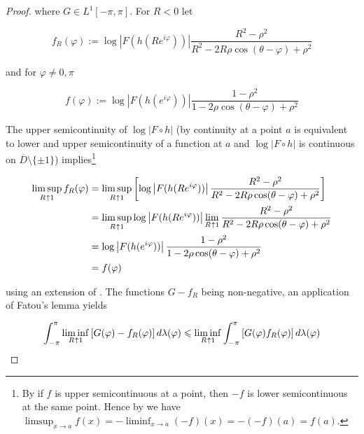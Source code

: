 \begin{proof}
where $G \in L^1[-\pi,\pi]$. For $R < 0$ let

\begin{equation*}
	f_R(\varphi) := \log\left| F(h(Re^{i\varphi}))\right| \frac{R^2 - \rho^2}{R^2 - 2R\rho\cos(\theta - \varphi) + \rho^2}
\end{equation*}

and for $\varphi \neq 0,\pi$

\begin{equation*}
	f(\varphi) := \log\left| F(h(e^{i\varphi}))\right| \frac{1 - \rho^2}{1 - 2\rho\cos(\theta - \varphi) + \rho^2}
\end{equation*}

The upper semicontinuity of $\log\left| F \circ h\right|$ (by \cite[360]{bourbaki:general_topology:1995} continuity at a point $a$ is equivalent to lower and upper semicontinuity of a function at $a$ and $\log \left| F \circ h\right|$ is continuous on $\overline{D}\setminus \{\pm 1\}$) implies\footnote{
	By \cite[360]{bourbaki:general_topology:1995} if $f$ is upper semicontinuous at a point, then $-f$ is lower semicontinuous at the same point. Hence by \cite[363]{bourbaki:general_topology:1995} we have $\limsup_{x \to a} f(x) = -\liminf_{x \to a}\left( -f \right)(x) = -\left( -f \right)(a) = f(a)$.
}

\begin{equation*}
	\begin{aligned}
		\limsup_{R \toup 1}f_R(\varphi) &= \limsup_{R \toup 1} \left[ \log\left| F(h(Re^{i\varphi}))\right| \frac{R^2 - \rho^2}{R^2 - 2R\rho\cos(\theta - \varphi) + \rho^2}\right]\\
		&= \limsup_{R \toup 1} \log\left| F(h(Re^{i\varphi}))\right| \lim_{R \toup 1} \frac{R^2 - \rho^2}{R^2 - 2R\rho\cos(\theta - \varphi) + \rho^2}\\
		&= \log\left| F(h(e^{i\varphi}))\right| \frac{1 - \rho^2}{1 - 2\rho\cos(\theta - \varphi) + \rho^2}\\
		&= f(\varphi)
	\end{aligned}
\end{equation*}

using an extension of \cite[359]{bourbaki:general_topology:1995}. The functions $G - f_R$ being non-negative, an application of Fatou's lemma yields

\begin{equation*}
	\int_{-\pi}^\pi \liminf_{R \toup 1}\left[ G(\varphi) - f_R(\varphi)\right]d\lambda(\varphi) \leqslant \liminf_{R \toup 1} \int_{-\pi}^\pi \left[ G(\varphi) f_R(\varphi)\right]d\lambda(\varphi)
\end{equation*}


\end{proof}
